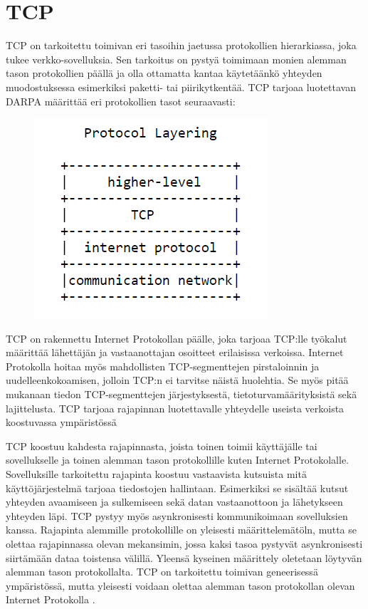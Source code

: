 \documentclass[utf8]{gradu3}
\begin{document}
\section{TCP}
TCP on tarkoitettu toimivan eri tasoihin jaetussa protokollien hierarkiassa, joka tukee verkko-sovelluksia. Sen tarkoitus on pystyä toimimaan monien alemman tason protokollien päällä ja olla ottamatta kantaa käytetäänkö yhteyden muodostuksessa esimerkiksi paketti- tai piirikytkentää. TCP tarjoaa luotettavan DARPA määrittää eri protokollien tasot seuraavasti:


\begin{figure}[h]
\centering
\includegraphics[scale=0.85]{protocol_layering.PNG}
\caption{\cite{tcp1_1}}
\end{figure}


TCP on rakennettu Internet Protokollan päälle, joka tarjoaa TCP:lle työkalut määrittää lähettäjän ja vastaanottajan osoitteet erilaisissa verkoissa. Internet Protokolla hoitaa myös mahdollisten TCP-segmenttejen pirstaloinnin ja uudelleenkokoamisen, jolloin TCP:n ei tarvitse näistä huolehtia. Se myös pitää mukanaan tiedon TCP-segmenttejen järjestyksestä, tietoturvamäärityksistä sekä lajittelusta. TCP tarjoaa rajapinnan luotettavalle yhteydelle useista verkoista koostuvassa ympäristössä \cite{tcp1_1} 

TCP koostuu kahdesta rajapinnasta, joista toinen toimii käyttäjälle tai sovellukselle ja toinen alemman tason protokollille kuten Internet Protokolalle. Sovelluksille tarkoitettu rajapinta koostuu vastaavista kutsuista mitä käyttöjärjestelmä tarjoaa tiedostojen hallintaan. Esimerkiksi se sisältää kutsut yhteyden avaamiseen ja sulkemiseen sekä datan vastaanottoon ja lähetykseen yhteyden läpi. TCP pystyy myös asynkronisesti kommunikoimaan sovelluksien kanssa. Rajapinta alemmille protokollille on yleisesti määrittelemätöln, mutta se olettaa rajapinnassa olevan mekansimin, jossa kaksi tasoa pystyvät asynkronisesti siirtämään dataa toistensa välillä. Yleensä kyseinen määrittely oletetaan löytyvän alemman tason protokollalta. TCP on tarkoitettu toimivan geneerisessä ympäristössä, mutta yleisesti voidaan olettaa alemman tason protokollan olevan Internet Protokolla \cite{tcp1_4}.
\end{document}
